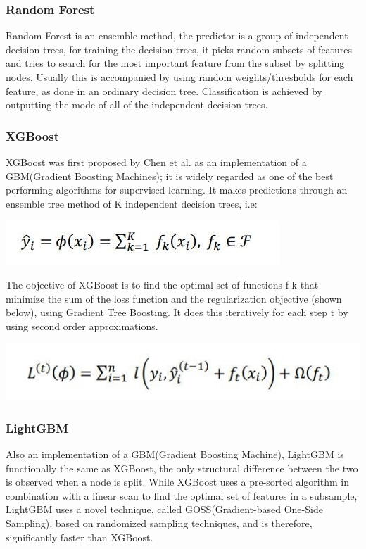\documentclass[sigconf, nonacm]{acmart}
\begin{document}
\subsubsection{Random Forest}

Random Forest is an ensemble method, the predictor is a group of independent decision trees, for training the decision trees, it picks random subsets of features and tries to search for the most important feature from the subset by splitting nodes. Usually this is accompanied by using random weights/thresholds for each feature, as done in an ordinary decision tree. Classification is achieved by outputting the mode of all of the independent decision trees.

\subsubsection{XGBoost}

XGBoost\cite{xgb} was first proposed by Chen et al. as an implementation of a GBM(Gradient Boosting Machines); it is widely regarded as one of the best performing algorithms for supervised learning. It makes predictions through an ensemble tree method of K independent decision trees, i.e:

\includegraphics[width=\linewidth]{figures/EQN3.jpg}

The objective of XGBoost is to find the optimal set of functions f k that minimize the sum of the loss function and the regularization objective (shown below), using Gradient Tree Boosting. It does this iteratively for each step t by using second order approximations.

\includegraphics[width=\linewidth]{figures/EQN4.jpg}

\subsubsection{LightGBM}

Also an implementation of a GBM(Gradient Boosting Machine), LightGBM\cite{lightgbm} is functionally the same as XGBoost, the only structural difference between the two is observed when a node is split. While XGBoost uses a pre-sorted algorithm in combination with a linear scan to find the optimal set of features in a subsample, LightGBM uses a novel technique, called GOSS(Gradient-based One-Side Sampling)\cite{goss}, based on randomized sampling techniques, and is therefore, significantly faster than XGBoost.
\end{document}
